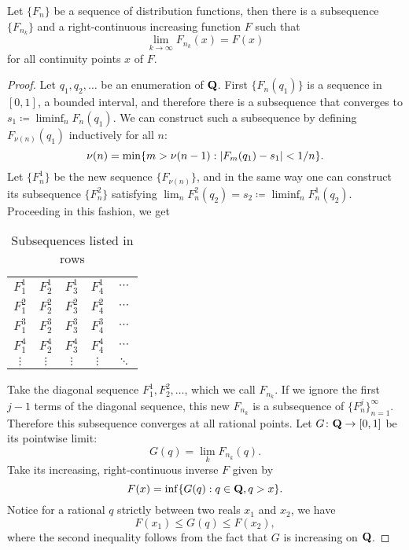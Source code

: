 \begin{lem} \label{lem:Helly-pre}
    Let $\{F_n\}$ be a sequence of distribution functions, then there is a subsequence $\{F_{n_k}\}$ and a right-continuous increasing function $F$ such that \[
        \lim_{k\to \infty} F_{n_k}(x) = F(x)
    \] for all continuity points $x$ of $F$.
\end{lem}

\begin{proof}
    Let $q_1,q_2,\dotsc$ be an enumeration of $\mathbf{Q}$. First $\{F_n(q_1)\}$ is a sequence in $[0,1]$, a bounded interval, and therefore there is a subsequence that converges to $s_1 \coloneqq \liminf_n F_n(q_1)$. We can construct such a subsequence by defining $F_{\nu(n)}(q_1)$ inductively for all $n$: \[
        \nu(n) = \min\{m > \nu(n-1): \lvert F_m(q_1) - s_1 \rvert < 1/ n\}.
    \] Let $\{F^1_n\}$ be the new sequence $\{F_{\nu(n)}\}$, and in the same way one can construct its subsequence $\{F^2_n\}$ satisfying $\lim_n F^2_n(q_2) = s_2 \coloneqq \liminf_n F_n^1(q_2)$. Proceeding in this fashion, we get 
    \begin{table}[ht]
    \renewcommand{\arraystretch}{1.2}
        \centering
        \caption*{Subsequences listed in rows}
        \begin{tabular}{ccccc}
            $F_1^1$ & $F_2^1$ & $F_3^1$ & $F_4^1$ & $\cdots$ \\
            $F_1^2$ & $F_2^2$ & $F_3^2$ & $F_4^2$ & $\cdots$ \\
            $F_1^3$ & $F_2^3$ & $F_3^3$ & $F_4^3$ & $\cdots$ \\
            $F_1^4$ & $F_2^4$ & $F_3^4$ & $F_4^4$ & $\cdots$ \\
            $\vdots$ & $\vdots$ & $\vdots$ & $\vdots$ & $\ddots$
        \end{tabular}
        \renewcommand{\arraystretch}{1}
    \end{table}
    
    Take the diagonal sequence $F_1^1, F_2^2,\dotsc$, which we call $F_{n_k}$. If we ignore the first $j-1$ terms of the diagonal sequence, this new $F_{n_k}$ is a subsequence of $\{F_n^j\}_{n=1}^\infty$. Therefore this subsequence converges at all rational points. Let $G\colon \mathbf{Q} \to [0,1]$ be its pointwise limit: \[
        G(q) = \lim_k F_{n_k}(q).
    \] Take its increasing, right-continuous inverse $F$ given by \[
        F(x) = \inf\{G(q): q\in \mathbf{Q}, q > x\}.
    \]
    Notice for a rational $q$ strictly between two reals $x_1$ and $x_2$, we have \begin{equation}
        F(x_1) \leq G(q) \leq F(x_2), \label{eq:right-cont-inv-ineq}
    \end{equation}
    where the second inequality follows from the fact that $G$ is increasing on $\mathbf{Q}$.


\end{proof}
